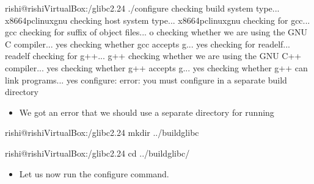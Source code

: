 \documentclass[letterpaper,10pt,english]{sphinxmanual}
\begin{document}
\begin{sphinxVerbatim}[commandchars=\\\{\}]
rishi@rishi\PYGZhy{}VirtualBox:\PYGZti{}/glibc\PYGZhy{}2.24\PYGZdl{} ./configure
checking build system type... x86\PYGZus{}64\PYGZhy{}pc\PYGZhy{}linux\PYGZhy{}gnu
checking host system type... x86\PYGZus{}64\PYGZhy{}pc\PYGZhy{}linux\PYGZhy{}gnu
checking for gcc... gcc
checking for suffix of object files... o
checking whether we are using the GNU C compiler... yes
checking whether gcc accepts \PYGZhy{}g... yes
checking for readelf... readelf
checking for g++... g++
checking whether we are using the GNU C++ compiler... yes
checking whether g++ accepts \PYGZhy{}g... yes
checking whether g++ can link programs... yes
configure: error: you must configure in a separate build directory
\end{sphinxVerbatim}
\begin{itemize}
\item {} 
We got an error that we should use a separate directory for running 

\end{itemize}

\begin{sphinxVerbatim}[commandchars=\\\{\}]
rishi@rishi\PYGZhy{}VirtualBox:\PYGZti{}/glibc\PYGZhy{}2.24\PYGZdl{} mkdir ../build\PYGZus{}glibc

rishi@rishi\PYGZhy{}VirtualBox:\PYGZti{}/glibc\PYGZhy{}2.24\PYGZdl{} cd ../build\PYGZus{}glibc/
\end{sphinxVerbatim}
\begin{itemize}
\item {} 
Let us now run the configure command.

\end{itemize}
\end{document}
